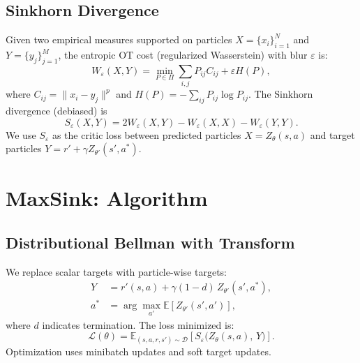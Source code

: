 \documentclass[10pt,twocolumn]{article}
\begin{document}
\subsection{Sinkhorn Divergence}
Given two empirical measures supported on particles $X=\{x_i\}_{i=1}^N$ and $Y=\{y_j\}_{j=1}^M$, the entropic OT cost (regularized Wasserstein) with blur $\varepsilon$ is:
\begin{equation}
W_\varepsilon(X,Y) = \min_{P\in\Pi}\sum_{i,j} P_{ij}C_{ij} + \varepsilon H(P),
\end{equation}
where $C_{ij}=\|x_i-y_j\|^p$ and $H(P)=-\sum_{ij}P_{ij}\log P_{ij}$. The Sinkhorn divergence (debiased) is
\begin{equation}
S_\varepsilon(X,Y) = 2W_\varepsilon(X,Y) - W_\varepsilon(X,X) - W_\varepsilon(Y,Y).
\label{eq:sinkhorn}
\end{equation}
We use $S_\varepsilon$ as the critic loss between predicted particles $X=Z_\theta(s,a)$ and target particles $Y=r' + \gamma Z_{\theta'}(s',a^*)$.

\section{MaxSink: Algorithm}
\subsection{Distributional Bellman with Transform}
We replace scalar targets with particle-wise targets:
\begin{align}
Y &= r'(s,a) + \gamma (1-d)\, Z_{\theta'}(s', a^*),\\
a^*&=\arg\max_{a'}\mathbb{E}[Z_{\theta'}(s',a')],
\end{align}
where $d$ indicates termination. The loss minimized is:
\begin{equation}
\mathcal{L}(\theta) = \mathbb{E}_{(s,a,r,s')\sim\mathcal{D}}\left[S_\varepsilon\big(Z_\theta(s,a),\,Y\big)\right].
\end{equation}
Optimization uses minibatch updates and soft target updates.
\end{document}
